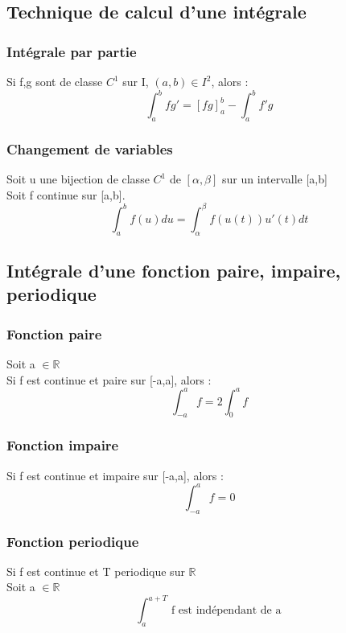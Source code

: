 \subsection{Technique de calcul d'une intégrale}
\subsubsection{Intégrale par partie}
\begin{de}
 Si f,g sont de classe $C^1$ sur I, $(a,b)\in I^2$, alors :
$$\int_a^b fg' = [fg]_a^b - \int_a^b f'g$$
\end{de}
\subsubsection{Changement de variables}
\begin{de}
 Soit u une bijection de classe $C^1$ de $[\alpha,\beta]$ sur un intervalle [a,b]\\
Soit f continue sur [a,b].
$$\int_a^b f(u)du = \int_{\alpha}^{\beta} f(u(t))u'(t)dt$$
\end{de}
\subsection{Intégrale d'une fonction paire, impaire, periodique}
\subsubsection{Fonction paire}
\begin{prop}
Soit a $\in \mathbb{R}$\\
Si f est continue et paire sur [-a,a], alors :
$$\int_{-a}^a f = 2\int_0^a f$$
\end{prop}
\subsubsection{Fonction impaire}
\begin{prop}
Si f est continue et impaire sur [-a,a], alors :
$$\int_{-a}^a f = 0$$
\end{prop}
\subsubsection{Fonction periodique}
\begin{prop}
Si f est continue et T periodique sur $\mathbb{R}$\\
Soit a $\in \mathbb{R}$
$$\int_a^{a+T} \mbox{ f est indépendant de a}$$
\end{prop}
